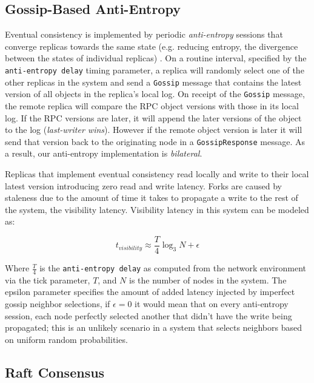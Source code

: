 \documentclass[10pt,conference,compsocconf,letterpaper]{IEEEtran}
\begin{document}
\subsection{Gossip-Based Anti-Entropy}

Eventual consistency is implemented by periodic \textit{anti-entropy} sessions that converge replicas towards the same state (e.g. reducing entropy, the divergence between the states of individual replicas) \cite{kempe_gossip-based_2003}. On a routine interval, specified by the \texttt{anti-entropy delay} timing parameter, a replica will randomly select one of the other replicas in the system and send a \texttt{Gossip} message that contains the latest version of all objects in the replica's local log. On receipt of the \texttt{Gossip} message, the remote replica will compare the RPC object versions with those in its local log. If the RPC versions are later, it will append the later versions of the object to the log (\textit{last-writer wins}). However if the remote object version is later it will send that version back to the originating node in a \texttt{GossipResponse} message. As a result, our anti-entropy implementation is \textit{bilateral}.

Replicas that implement eventual consistency read locally and write to their local latest version introducing zero read and write latency. Forks are caused by staleness due to the amount of time it takes to propagate a write to the rest of the system, the visibility latency. Visibility latency in this system can be modeled as:

\begin{equation}
t_{visibility} \approx \frac{T}{4} \log_3N + \epsilon
\end{equation}

Where $\frac{T}{4}$ is the \texttt{anti-entropy delay} as computed from the network environment via the tick parameter, $T$, and $N$ is the number of nodes in the system. The epsilon parameter specifies the amount of added latency injected by imperfect gossip neighbor selections, if $\epsilon = 0$ it would mean that on every anti-entropy session, each node perfectly selected another that didn't have the write being propagated; this is an unlikely scenario in a system that selects neighbors based on uniform random probabilities.

\subsection{Raft Consensus}
\end{document}
